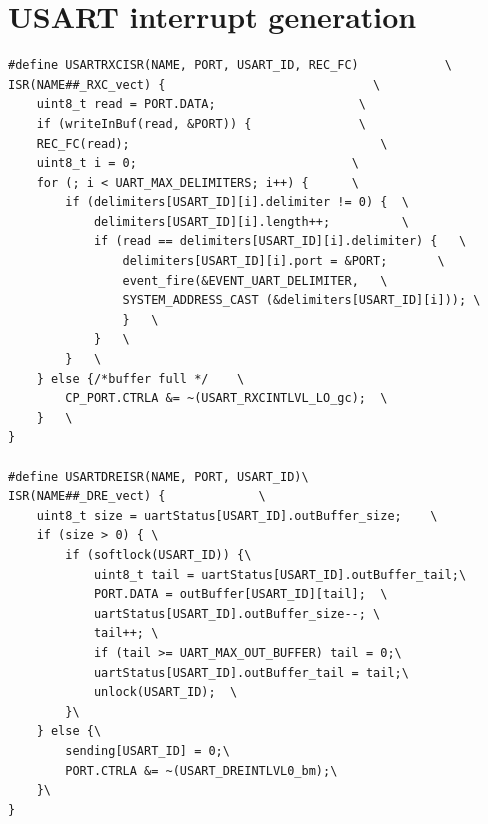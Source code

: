 \documentclass{report}
\begin{document}
\clearpage
{}
\setcounter{page}{\value{roman}}
\pagestyle{empty}
\appendix



\chapter{USART interrupt generation}
\label{append:usartinterruptgen}
\begin{verbatim}
#define USARTRXCISR(NAME, PORT, USART_ID, REC_FC)            \
ISR(NAME##_RXC_vect) {                             \
	uint8_t read = PORT.DATA;                    \
	if (writeInBuf(read, &PORT)) {               \
	REC_FC(read);                                   \
	uint8_t i = 0;                              \
	for (; i < UART_MAX_DELIMITERS; i++) {      \
		if (delimiters[USART_ID][i].delimiter != 0) {  \
			delimiters[USART_ID][i].length++;          \
			if (read == delimiters[USART_ID][i].delimiter) {   \
				delimiters[USART_ID][i].port = &PORT;       \
				event_fire(&EVENT_UART_DELIMITER,	\
				SYSTEM_ADDRESS_CAST (&delimiters[USART_ID][i])); \
				}   \
			}   \
		}   \
	} else {/*buffer full */    \
		CP_PORT.CTRLA &= ~(USART_RXCINTLVL_LO_gc);  \
	}   \
}

#define USARTDREISR(NAME, PORT, USART_ID)\
ISR(NAME##_DRE_vect) {             \
	uint8_t size = uartStatus[USART_ID].outBuffer_size;    \
	if (size > 0) { \
		if (softlock(USART_ID)) {\
			uint8_t tail = uartStatus[USART_ID].outBuffer_tail;\
			PORT.DATA = outBuffer[USART_ID][tail];  \
			uartStatus[USART_ID].outBuffer_size--; \
			tail++; \
			if (tail >= UART_MAX_OUT_BUFFER) tail = 0;\
			uartStatus[USART_ID].outBuffer_tail = tail;\
			unlock(USART_ID);  \
		}\
	} else {\
		sending[USART_ID] = 0;\
		PORT.CTRLA &= ~(USART_DREINTLVL0_bm);\
	}\
}
\end{verbatim}
\end{document}
